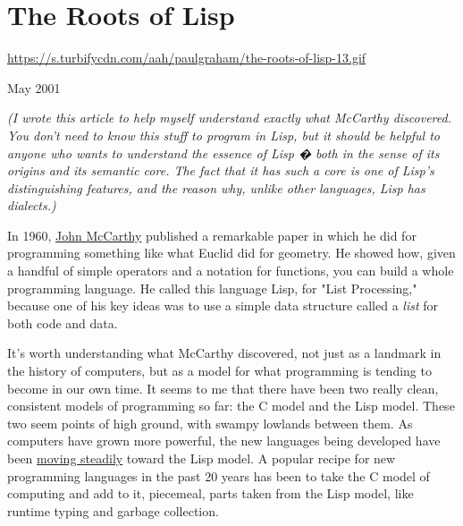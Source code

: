 \chapter{The Roots of Lisp}


            
              
                \href{https://s.turbifycdn.com/aah/paulgraham/the-roots-of-lisp-13.gif}{https://s.turbifycdn.com/aah/paulgraham/the-roots-of-lisp-13.gif}

May 2001
                  
                    \emph{(I wrote this article to help myself understand exactly
                      what McCarthy discovered. You don't need to know this
                      stuff to program in Lisp, but it should be helpful to
                      anyone who wants to understand the essence of Lisp � both
                      in the sense of its origins and its semantic core. The
                      fact that it has such a core is one of Lisp's
                      distinguishing features, and the reason why, unlike other
                      languages, Lisp has dialects.)}

In 1960,
                    \href{http://www-formal.stanford.edu/jmc/index.html}{John McCarthy}
                    published a remarkable paper in which he did for programming
                    something like what Euclid did for geometry. He showed how,
                    given a handful of simple operators and a notation for
                    functions, you can build a whole programming language. He
                    called this language Lisp, for "List Processing," because
                    one of his key ideas was to use a simple data structure
                    called a \emph{list} for both code and data.

It's
                    worth understanding what McCarthy discovered, not just as a
                    landmark in the history of computers, but as a model for
                    what programming is tending to become in our own time. It
                    seems to me that there have been two really clean,
                    consistent models of programming so far: the C model and the
                    Lisp model. These two seem points of high ground, with
                    swampy lowlands between them. As computers have grown more
                    powerful, the new languages being developed have been
                    \href{http://www.paulgraham.com/diff.html}{moving steadily} toward the Lisp
                    model. A popular recipe for new programming languages in the
                    past 20 years has been to take the C model of computing and
                    add to it, piecemeal, parts taken from the Lisp model, like
                    runtime typing and garbage collection.

